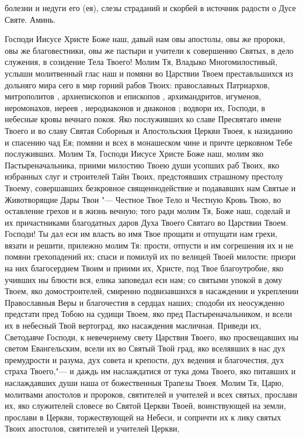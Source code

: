 \begin{mymulticols}
болезни и недуги его (ея), слезы страданий и скорбей в источник радости о Дусе Святе. Аминь. 

\end{mymulticols}

\mychapterending


\vspace{-\baselineskip}

\begin{mymulticols}

Господи Иисусе Христе Боже наш, давый нам овы апостолы, овы же пророки, овы же благовестники, овы же пастыри и учители к совершению Святых, в дело служения, в созидение Тела Твоего! Молим Тя, Владыко Многомилостивый, услыши молитвенный глас наш и помяни во Царствии Твоем преставльшихся из дольняго мира сего в мир горний рабов Твоих: православных Патриархов, митрополитов , архиепископов и епископов , архимандритов, игуменов, иеромонахов, иереев , иеродиаконов и диаконов ; водвори их, Господи, в небесные кровы вечнаго покоя. Яко послуживших ко славе Пресвятаго имене Твоего и во славу Святая Соборныя и Апостольския Церкви Твоея, к назиданию и спасению чад Ея; помяни и всех в монашеском чине и причте церковном Тебе послуживших. Молим Тя, Господи Иисусе Христе Боже наш, молим яко Пастыреначальника, приими милостию Твоею души усопших раб Твоих, яко избранных слуг и строителей Тайн Твоих, предстоявших страшному престолу Твоему, совершавших безкровное священнодействие и подававших нам Святые и Животворящие Дары Твои "--- Честное Твое Тело и Честную Кровь Твою, во оставление грехов и в жизнь вечную; того ради молим Тя, Боже наш, соделай и их причастниками благодатных даров Духа Твоего Святаго во Царствии Твоем. Господи! Ты дал еси им власть во имя Твое прощати и отпущати нам грехи, вязати и решити, прилежно молим Тя: прости, отпусти и им согрешения их и не помяни грехопадений их; спаси и помилуй их по велицей Твоей милости; призри на них благосердием Твоим и приими их, Христе, под Твое благоутробие, яко учивших ны блюсти вся, елика заповедал еси нам; со святыми упокой в дому Твоем, яко домостроителей, смиренно подвизавшихся в насаждении и укреплении Православныя Веры и благочестия в сердцах наших; сподоби их неосужденно предстати пред Тобою на судищи Твоем, яко пред Пастыреначальником, и всели их в небесный Твой вертоград, яко насаждения масличная. Приведи их, Светодавче Господи, к невечернему свету Царствия Твоего, яко просвещавших ны светом Евангельским, всели их во Святый Твой град, яко вселявших в нас дух премудрости и разума, дух совета и крепости, дух ведения и благочестия, дух страха Твоего,"--- и даждь им наслаждатися от тука дома Твоего, яко питавших и наслаждавших души наша от божественныя Трапезы Твоея. Молим Тя, Царю, молитвами апостолов и пророков, святителей и учителей и всех святых, прослави их, яко служителей словесе во Святой Церкви Твоей, воинствующей на земли, прослави в Церкви, торжествующей на Небеси, и сопричти их к лику святых Твоих апостолов, святителей и учителей Церкви, 
\end{mymulticols}

